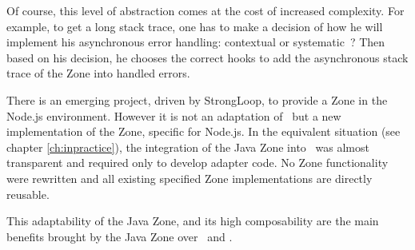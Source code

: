 Of course, this level of abstraction comes at the cost of increased complexity. For example, to get a long stack trace, one has to make a decision of how he will implement his asynchronous error handling: contextual or systematic~? Then based on his decision, he chooses the correct hooks to add the asynchronous stack trace of the Zone into handled errors.

There is an emerging project, driven by StrongLoop, to provide a Zone in the Node.js environment. However it is not an adaptation of \zonejs\ but a new implementation of the Zone, specific for Node.js. In the equivalent situation (see chapter \ref{ch:inpractice}), the integration of the Java Zone into \vertx\ was almost transparent and required only to develop adapter code. No Zone functionality were rewritten and all existing specified Zone implementations are directly reusable.

This adaptability of the Java Zone, and its high composability are the main benefits brought by the Java Zone over \zonejs\ and \zonedrt.
